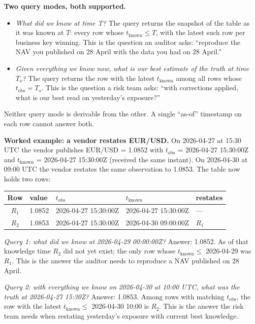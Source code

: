 \documentclass[11pt,a4paper]{article}
\begin{document}
\textbf{Two query modes, both supported.}
\begin{itemize}
\item \emph{What did we know at time T?} The query returns the snapshot of the table as it was known at $T$: every row whose $t_\text{known} \le T$, with the latest such row per business key winning. This is the question an auditor asks: ``reproduce the NAV you published on 28 April with the data you had on 28 April.''
\item \emph{Given everything we know now, what is our best estimate of the truth at time $T_o$?} The query returns the row with the latest $t_\text{known}$ among all rows whose $t_\text{obs} = T_o$. This is the question a risk team asks: ``with corrections applied, what is our best read on yesterday's exposure?''
\end{itemize}
Neither query mode is derivable from the other. A single ``as-of'' timestamp on each row cannot answer both.

\textbf{Worked example: a vendor restates EUR/USD.} On 2026-04-27 at 15:30 UTC the vendor publishes EUR/USD = 1.0852 with $t_\text{obs}$ = 2026-04-27 15:30:00Z and $t_\text{known}$ = 2026-04-27 15:30:00Z (received the same instant). On 2026-04-30 at 09:00 UTC the vendor restates the same observation to 1.0853. The table now holds two rows:

\begin{center}
\begin{tabular}{cllll}
\toprule
Row & value & $t_\text{obs}$ & $t_\text{known}$ & restates \\
\midrule
$R_1$ & 1.0852 & 2026-04-27 15:30:00Z & 2026-04-27 15:30:00Z & --- \\
$R_2$ & 1.0853 & 2026-04-27 15:30:00Z & 2026-04-30 09:00:00Z & $R_1$ \\
\bottomrule
\end{tabular}
\end{center}

\emph{Query 1: what did we know at 2026-04-29 00:00:00Z?} Answer: 1.0852. As of that knowledge time $R_2$ did not yet exist; the only row whose $t_\text{known} \le$ 2026-04-29 was $R_1$. This is the answer the auditor needs to reproduce a NAV published on 28 April.

\emph{Query 2: with everything we know on 2026-04-30 at 10:00 UTC, what was the truth at 2026-04-27 15:30Z?} Answer: 1.0853. Among rows with matching $t_\text{obs}$, the row with the latest $t_\text{known} \le$ 2026-04-30 10:00 is $R_2$. This is the answer the risk team needs when restating yesterday's exposure with current best knowledge.
\end{document}
